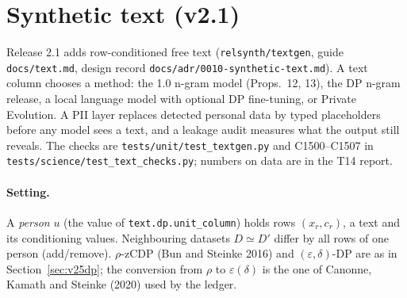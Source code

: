 \section{Synthetic text (v2.1)}\label{sec:v50text}
\setcounter{savedproptx}{\value{proposition}}
\setcounter{proposition}{1499}
Release 2.1 adds row-conditioned free text (\texttt{relsynth/textgen}, guide \texttt{docs/text.md}, design record
\texttt{docs/adr/0010-synthetic-text.md}). A text column chooses a method: the 1.0 n-gram model (Props.~12, 13), the
DP n-gram release, a local language model with optional DP fine-tuning, or Private Evolution. A PII layer replaces
detected personal data by typed placeholders before any model sees a text, and a leakage audit measures what the
output still reveals. The checks are \texttt{tests/unit/test\_textgen.py} and C1500--C1507 in
\texttt{tests/science/test\_text\_checks.py}; numbers on data are in the T14 report.

\paragraph{Setting.} A \emph{person} $u$ (the value of \texttt{text.dp.unit\_column}) holds rows $(x_r,c_r)$, a text
and its conditioning values. Neighbouring datasets $D\simeq D'$ differ by all rows of one person (add/remove).
$\rho$-zCDP (Bun and Steinke 2016) and $(\varepsilon,\delta)$-DP are as in Section~\ref{sec:v25dp}; the conversion
from $\rho$ to $\varepsilon(\delta)$ is the one of Canonne, Kamath and Steinke (2020) used by the ledger.

